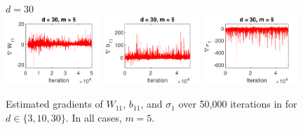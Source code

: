 \documentclass[10pt]{article}
\begin{document}
\begin{figure}[p!]
\\
$d=30$ \\
\includegraphics[width=0.32\textwidth,trim={0 0 0 11.5},clip]{images/bananaND_usivi_gW11_d30_m5.pdf}
\includegraphics[width=0.32\textwidth,trim={0 0 0 11.5},clip]{images/bananaND_usivi_gb11_d30_m5.pdf}
\includegraphics[width=0.32\textwidth,trim={0 0 0 11.5},clip]{images/bananaND_usivi_gsigma1_d30_m5.pdf}
\caption{Estimated gradients of $W_{11}$, $b_{11}$, and $\sigma_1$ over 50,000 \sgd iterations in \uivi for $d\in\{3,10,30\}$. In all cases, $m=5$.}
\label{fig:dimresults}
\end{figure}
\end{document}
